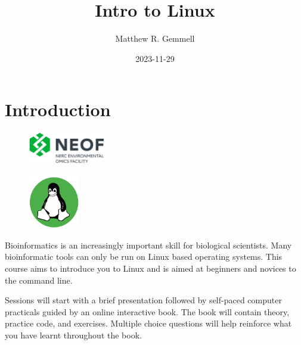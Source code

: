 \documentclass[
  letterpaper,
  DIV=11,
  numbers=noendperiod]{scrreprt}
\title{Intro to Linux}
\author{Matthew R. Gemmell}
\date{2023-11-29}
\renewcommand*\contentsname{Table of contents}
\newcommand\contentsname{Table of contents}
\begin{document}
\maketitle
\ifdefined\Shaded\renewenvironment{Shaded}{\begin{tcolorbox}[breakable, enhanced, boxrule=0pt, frame hidden, borderline west={3pt}{0pt}{shadecolor}, interior hidden, sharp corners]}{\end{tcolorbox}}\fi

\renewcommand*\contentsname{Table of contents}
{
\hypersetup{linkcolor=}
\setcounter{tocdepth}{2}
\tableofcontents
}
\hypertarget{intro}{%
\chapter{Introduction}\label{intro}}

\begin{figure}

{\centering \includegraphics[width=0.3\textwidth,height=\textheight]{figures/NEOF.png}

}

\end{figure}

\begin{figure}

{\centering \includegraphics[width=0.2\textwidth,height=\textheight]{figures/linux_beginner.png}

}

\end{figure}

Bioinformatics is an increasingly important skill for biological
scientists. Many bioinformatic tools can only be run on Linux based
operating systems. This course aims to introduce you to Linux and is
aimed at beginners and novices to the command line.

Sessions will start with a brief presentation followed by self-paced
computer practicals guided by an online interactive book. The book will
contain theory, practice code, and exercises. Multiple choice questions
will help reinforce what you have learnt throughout the book.
\end{document}
